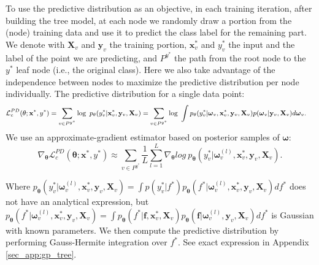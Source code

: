 \documentclass{article}
\newcommand{\bld}[1]{\boldsymbol{#1}}
\def\rvf{{\mathbf{f}}}
\def\rvx{{\mathbf{x}}}
\def\rvy{{\mathbf{y}}}
\def\rmX{{\mathbf{X}}}
\newcommand{\rvomega}{\bld{\mathbf{\omega}}}
\newcommand{\NNP}{\mathbf{\theta}}
\begin{document}
To use the predictive distribution as an objective, in each training iteration, after building the tree model, at each node we randomly draw a portion from the (node) training data and use it to predict the class label for the remaining part. We denote with $\rmX_v$ and $\rvy_v$ the training portion, $\rvx^{*}_v$ and $y^{*}_v$ the input and the label of the point we are predicting, and $P^{y^*}$ the path from the root node to the $y^*$ leaf node (i.e., the original class). Here we also take advantage of the independence between nodes to maximize the predictive distribution per node individually. The predictive distribution for a single data point: 
\begin{equation}\label{eq:tree_objective_pl}
    \small
    \begin{aligned}
        \mathcal{L}^{PD}_c (\NNP ;\rvx^*,y^*) &= \sum_{v \in P^{y^*}} \log~p_{\NNP}( y_{v}^{*} | \rvx_{v}^{*}, \rvy_{v},  \rmX_{v})
        = \sum_{v \in P^{y^*}} \log~\int p_{\NNP}( y_{v}^{*} | \rvomega_{v}, \rvx_{v}^{*}, \rvy_{v}, \rmX_{v}) p(\rvomega_{v} | \rvy_{v}, \rmX_{v}) d\rvomega_{v}.
    \end{aligned}
\end{equation}
We use an approximate-gradient estimator based on posterior samples of $\rvomega$:
\begin{equation}\label{eq:tree_objective_pl_gradients}
        \nabla_{\NNP}\mathcal{L}^{PD}_c (\NNP ;\rvx^*,y^*) \approx \sum_{v \in P^{y^*}} \frac{1}{L} \sum_{l=1}^{L} \nabla_{\NNP}log~p_{\NNP}(y_{v}^{*} | \rvomega_{v}^{(l)}, \rvx_{v}^{*}, \rvy_{v}, \rmX_{v}).
\end{equation}
\iffalse
\begin{equation}\label{eq:tree_objective_pl_gradients}
    \begin{aligned}
        \nabla_{\NNP}\mathcal{L}^{PL}_c (\NNP ;\rvx^*,y^*) &= \sum_{v \in P^{y^*}} \int p_{\NNP}(\rvomega_{v} | \rvy_{v}, \rmX_{v})\nabla_{\NNP}log~p_{\NNP}(y_{v}^{*} | \rvomega_{v}, \rvx_{v}^{*}, y_{v}, \rmX_{v}) d\rvomega_{v}\\
        &\approx \sum_{v \in P^{y^*}} \frac{1}{L} \sum_{l=1}^{L} \nabla_{\NNP}log~p_{\NNP}(y_{v}^{*} | \rvomega_{v}^{(l)}, \rvx_{v}^{*}, \rvy_{v}, \rmX_{v}).
    \end{aligned}
\end{equation}
\fi
Where $p_{\NNP}(y_{v}^{*} | \rvomega_{v}^{(l)}, \rvx_{v}^{*}, \rvy_{v}, \rmX_{v})=\int p(y_{v}^{*} | f^*) p_{\NNP}(f^* | \rvomega_{v}^{(l)}, \rvx_{v}^{*}, \rvy_{v}, \rmX_{v})df^*$ does not have an analytical expression, 
but $p_{\NNP}(f^* | \rvomega_{v}^{(l)}, \rvx_{v}^{*}, \rvy_{v}, \rmX_{v})=\int p_{\NNP}(f^* |\rvf,\rvx_{v}^{*}, \rmX_{v})p_{\NNP}(\rvf | \rvomega_{v}^{(l)}, \rvy_{v}, \rmX_{v})df^*$ is Gaussian with known parameters. We then compute the predictive distribution by performing Gauss-Hermite integration over $f^*$. See exact expression in Appendix \ref{sec_app:gp_tree}.
\end{document}
